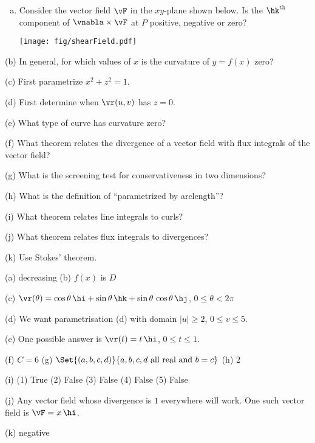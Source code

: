 \begin{question}[M317 2010D]
\begin{enumerate}[(a)]
\item 
Consider the vector field $\vF$ in the $xy$-plane shown below.
Is the $\hk^{\rm th}$ component of $\vnabla\times\vF$ at $P$ 
positive, negative or zero?

  \begin{center}
       \texttt{[image: fig/shearField.pdf]}
  \end{center}





\end{enumerate}
\end{question}

\begin{hint} 
(b) In general, for which values of $x$ is the curvature of $y=f(x)$ zero?

(c) First parametrize $x^2+z^2=1$.

(d) First determine when $\vr(u,v)$ has $z=0$. 

(e) What type of curve has curvature zero?

(f) What theorem relates the divergence of a vector field with flux
integrals of the vector field? 

(g) What is the screening test for conservativeness in two dimensions?

(h) What is the definition of ``parametrized by arclength''?

(i) What theorem relates line integrals to curls?

(j) What theorem relates flux integrals to divergences?

(k) Use Stokes' theorem.


\end{hint}

\begin{answer} 
(a) decreasing\qquad
(b) $f(x)$ is $D$

(c) $\vr(\theta) = \cos\theta\,\hi +\sin\theta\,\hk 
         + \sin\theta\,\cos\theta\,\hj$,  $0\le\theta<2\pi$

(d) We want parametrisation (d) with domain $|u|\ge 2$, $0\le v\le 5$.

(e) One possible answer is $\vr(t) = t\,\hi$, $0\le t\le 1$.

(f) $C=6$\qquad
(g) $\Set{(a,b,c,d)}{a,b,c,d\text{ all real and }b=c}$\qquad
(h) 2

(i) (1) True \quad
    (2) False \quad
    (3) False \quad
    (4) False \quad
    (5) False

(j) Any vector field whose divergence is $1$ everywhere will work.
One such vector field is $\vF=x\,\hi$.

(k) negative

\end{answer}



